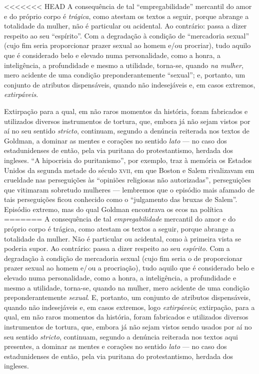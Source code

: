 <<<<<<< HEAD
A consequência de tal ``empregabilidade'' mercantil do amor e do próprio
corpo é \emph{trágica}, como atestam os textos a seguir, porque abrange
a totalidade da mulher, não é particular ou acidental.
Ao contrário: passa a dizer respeito ao seu
``espírito''. Com a degradação à condição de ``mercadoria sexual'' (cujo
fim seria proporcionar prazer sexual ao homem e/ou procriar),
tudo aquilo que é considerado belo e elevado numa personalidade, como a
honra, a inteligência, a profundidade e mesmo a utilidade, torna-se,
quando \emph{na mulher}, mero acidente de uma condição
preponderantemente ``sexual''; e, portanto, um conjunto de atributos
dispensáveis, quando não indesejáveis e, em casos extremos,
\emph{extirpáveis}.

Extirpação para a qual, em não raros momentos da
história, foram fabricados e utilizados diversos instrumentos de
tortura, que, embora já não sejam vistos por aí no seu
sentido \emph{stricto}, continuam, segundo a denúncia reiterada nos
textos de Goldman, a dominar as mentes e corações no sentido
\emph{lato} --- no caso dos estadunidenses de então, pela via puritana do
protestantismo, herdada dos ingleses. ``A
hipocrisia do puritanismo'', por exemplo, traz à memória os Estados Unidos da
segunda metade do século \textsc{xvii}, em que Boston e Salem rivalizavam em
crueldade nas perseguições às ``opiniões religiosas não autorizadas'',
perseguições que vitimaram sobretudo mulheres --- lembremos que o
episódio mais afamado de tais perseguições ficou conhecido como o
``julgamento das bruxas de Salem''.
Episódio extremo, mas do qual Goldman encontrava os ecos na política
=======
A consequência de tal \textit{empregabilidade} mercantil do amor e do próprio
corpo é trágica, como atestam os textos a seguir, porque abrange
a totalidade da mulher. Não é particular ou acidental, como à primeira
vista se poderia supor. Ao contrário: passa a dizer respeito ao seu
\textit{espírito}. Com a degradação à condição de mercadoria sexual (cujo
fim seria o de proporcionar prazer sexual ao homem e/\,ou a procriação),
tudo aquilo que é considerado belo e elevado numa personalidade, como a
honra, a inteligência, a profundidade e mesmo a utilidade, torna-se,
quando na mulher, mero acidente de uma condição
preponderantemente \textit{sexual}. E, portanto, um conjunto de atributos
dispensáveis, quando não indesejáveis e, em casos extremos, logo
\textit{extirpáveis}; extirpação, para a qual, em não raros momentos da
história, foram fabricados e utilizados diversos instrumentos de
tortura, que, embora já não sejam vistos sendo usados por aí no seu
sentido \textit{stricto}, continuam, segundo a denúncia reiterada nos
textos aqui presentes, a dominar as mentes e corações no sentido
\textit{lato} --- no caso dos estadunidenses de então, pela via puritana do
protestantismo, herdada dos ingleses. 

